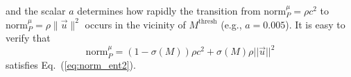 \documentclass[review,10pt]{elsarticle}
\newcommand{\norm}{\textrm{norm}}
\renewcommand{\Re}{\textrm{Re}}
\newcommand{\Pe}{\textrm{P\'e}}
\newcommand{\resinew}{\widetilde{R}_\text{ent}}
\newcommand{\eqt}[1]{Eq.~(\ref{#1})}                     %
\begin{document}
and the scalar $a$ determines how rapidly the transition from  
$\norm_P^\mu= \rho c^2$ to $\norm_P^\mu=\rho \| \vec{u}\|^2$ occurs in the vicinity of $M^\text{thresh}$ (e.g., $a = 0.005$). 
It is easy to verify that
\begin{equation}
\label{eq:norm_ent3}
\norm_P^\mu = (1-\sigma(M)) \rho c^2  + \sigma(M)  \rho ||\vec{u} ||^2  
\end{equation}
satisfies \eqt{eq:norm_ent2}.
%
%
\end{document}
